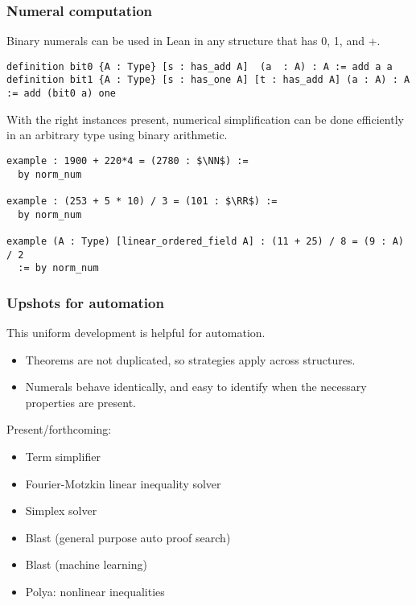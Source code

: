 \documentclass{beamer}
\newcommand{\RR}{\mathbb{R}}
\newcommand{\NN}{\mathbb{N}}
\begin{document}
\begin{frame}[fragile]
\frametitle{Numeral computation}
Binary numerals can be used in Lean in any structure that has 0, 1, and +. 

\begin{lstlisting}[basicstyle=\footnotesize]
definition bit0 {A : Type} [s : has_add A]  (a  : A) : A := add a a
definition bit1 {A : Type} [s : has_one A] [t : has_add A] (a : A) : A := add (bit0 a) one
\end{lstlisting}

\vspace{.5em}

With the right instances present, numerical simplification can be done efficiently in an arbitrary type using binary arithmetic.

\begin{lstlisting}[basicstyle=\footnotesize]
example : 1900 + 220*4 = (2780 : $\NN$) :=
  by norm_num

example : (253 + 5 * 10) / 3 = (101 : $\RR$) :=
  by norm_num
     
example (A : Type) [linear_ordered_field A] : (11 + 25) / 8 = (9 : A) / 2
  := by norm_num
\end{lstlisting}

\end{frame}

\begin{frame}
\frametitle{Upshots for automation}
This uniform development is helpful for automation.

\begin{itemize}
\item Theorems are not duplicated, so strategies apply across structures.
\item Numerals behave identically, and easy to identify when the necessary properties are present.
\end{itemize}

Present/forthcoming:
\begin{itemize}
\item Term simplifier
\item Fourier-Motzkin linear inequality solver
\item Simplex solver
\item Blast (general purpose auto proof search)
\item Blast (machine learning)
\item Polya: nonlinear inequalities
\end{itemize}

\end{frame}
\end{document}
